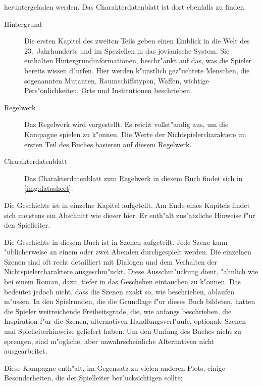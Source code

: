 \begin{description}
        heruntergeladen werden. Das Charakterdatenblatt ist dort ebenfalls zu finden.
        \begin{description}
            \item [Hintergrund] Die ersten Kapitel des zweiten Teils  geben einen Einblick in die Welt des 
                23.~Jahrhunderts und im Speziellen in das jovianische System. Sie enthalten Hintergrundinformationen, beschr"ankt auf das, was die Spieler bereits wissen d"urfen. Hier werden k"unstlich gez"uchtete Menschen, die sogenannten Mutanten, Raumschiffstypen, Waffen, wichtige Pers"onlichkeiten, Orte und Institutionen beschrieben.
            \item [Regelwerk] Das Regelwerk wird  vorgestellt. Es reicht vollst"andig aus, um die Kampagne 
                spielen zu k"onnen. Die Werte der Nichtspielercharaktere im ersten Teil des Buches basieren auf diesem Regelwerk.
            \item [Charakterdatenblatt] Das Charakterdatenblatt zum Regelwerk in diesem Buch findet sich in \cref{img:datasheet}.
        \end{description}        
\end{description}


\begin{remarks}
    Die Geschichte ist in einzelne Kapitel aufgeteilt. Am Ende eines Kapitels findet sich meistens ein Abschnitt wie dieser hier. Er enth"alt zus"atzliche Hinweise f"ur den Spielleiter.
\end{remarks}


Die Geschichte in diesem Buch ist in Szenen aufgeteilt. Jede Szene kann "ublicherweise an einem oder zwei Abenden durchgespielt werden. Die einzelnen Szenen sind oft recht detailliert mit Dialogen und dem Verhalten der Nichtspielercharaktere ausgeschm"uckt. Diese Ausschm"uckung dient, "ahnlich wie bei einem Roman, dazu, tiefer in das Geschehen eintauchen zu k"onnen. Das bedeutet jedoch nicht, dass die Szenen exakt so, wie beschrieben, ablaufen m"ussen. In den Spielrunden, die die Grundlage f"ur dieses Buch bildeten, hatten die Spieler weitreichende Freiheitsgrade, die, wie anfangs beschrieben, die Inspiration f"ur die Szenen, alternativen Handlungsverl"aufe, optionale Szenen und Spielleiterhinweise geliefert haben. Um den Umfang des Buches nicht zu sprengen, sind m"ogliche, aber unwahrscheinliche Alternativen nicht ausgearbeitet.

Diese Kampagne enth"alt, im Gegensatz zu vielen anderen Plots, einige Besonderheiten, die der Spielleiter ber"ucksichtigen sollte:

